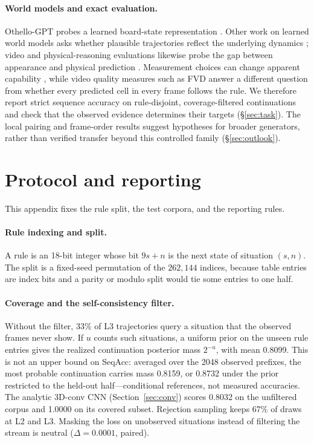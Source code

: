 \documentclass[11pt]{article}
\begin{document}
\paragraph{World models and exact evaluation.}
Othello-GPT probes a learned board-state representation
\citep{li2023emergent}. Other work on learned world models asks whether
plausible trajectories reflect the underlying dynamics \citep{ha2018world, vafa2024evaluating,
vafa2025foundation}; video and physical-reasoning evaluations likewise probe
the gap between appearance and physical prediction
\citep{bear2021physion, bansal2024videophy, motamed2025physicsiq}.
Measurement choices can change apparent capability
\citep{schaeffer2023emergent}, while video quality measures such as FVD
\citep{unterthiner2018towards} answer a different question from whether
every predicted cell in every frame follows the rule. We therefore report
strict sequence accuracy on rule-disjoint, coverage-filtered continuations
and check that the observed evidence determines their targets
(\S\ref{sec:task}). The local pairing and frame-order results suggest
hypotheses for broader generators, rather than verified transfer beyond this
controlled family (\S\ref{sec:outlook}).

\section{Protocol and reporting}
\label{app:protocol}
\label{app:reporting}

This appendix fixes the rule split, the test corpora, and the reporting rules.

\paragraph{Rule indexing and split.}
A rule is an 18-bit integer whose bit $9s+n$ is the next state of situation $(s,n)$. The split is a fixed-seed permutation of the $262{,}144$ indices, because table entries are index bits and a parity or modulo split would tie some entries to one half.

\paragraph{Coverage and the self-consistency filter.}
Without the filter, 33\% of L3 trajectories query a situation that the observed frames never show. If $u$ counts such situations, a uniform prior on the unseen rule entries gives the realized continuation posterior mass $2^{-u}$, with mean 0.8099. This is not an upper bound on SeqAcc: averaged over the 2048 observed prefixes, the most probable continuation carries mass 0.8159, or 0.8732 under the prior restricted to the held-out half---conditional references, not measured accuracies. The analytic 3D-conv CNN (Section~\ref{sec:conv}) scores 0.8032 on the unfiltered corpus and 1.0000 on its covered subset. Rejection sampling keeps 67\% of draws at L2 and L3. Masking the loss on unobserved situations instead of filtering the stream is neutral ($\Delta = 0.0001$, paired).
\end{document}
